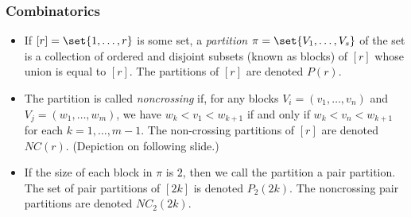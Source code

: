 \documentclass{beamer}
\begin{document}
\begin{frame}
  \frametitle{Combinatorics}
  \begin{itemize}
    \item If $[r] = \set{1,\dots,r}$ is some set, a \textit{partition} $\pi = \set{V_1,\dots,V_s}$ of the set is a collection of ordered and disjoint subsets (known as blocks) of $[r]$ whose union is equal to $[r]$. The partitions of $[r]$ are denoted $P(r)$.\pause
    \item The partition is called \textit{noncrossing} if, for any blocks $V_i = \left( v_1,\dots,v_n \right)$ and $V_j = \left( w_1,\dots,w_m \right)$, we have $w_k < v_1 < w_{k+1}$ if and only if $w_k < v_n < w_{k+1}$ for each $k=1,\dots,m-1$. The non-crossing partitions of $[r]$ are denoted $NC(r)$. (Depiction on following slide.)\pause
    \item If the size of each block in $\pi$ is $2$, then we call the partition a pair partition. The set of pair partitions of $[2k]$ is denoted $P_2\left( 2k \right)$. The noncrossing pair partitions are denoted $NC_2\left( 2k \right)$.
  \end{itemize}
\end{frame}
\end{document}
